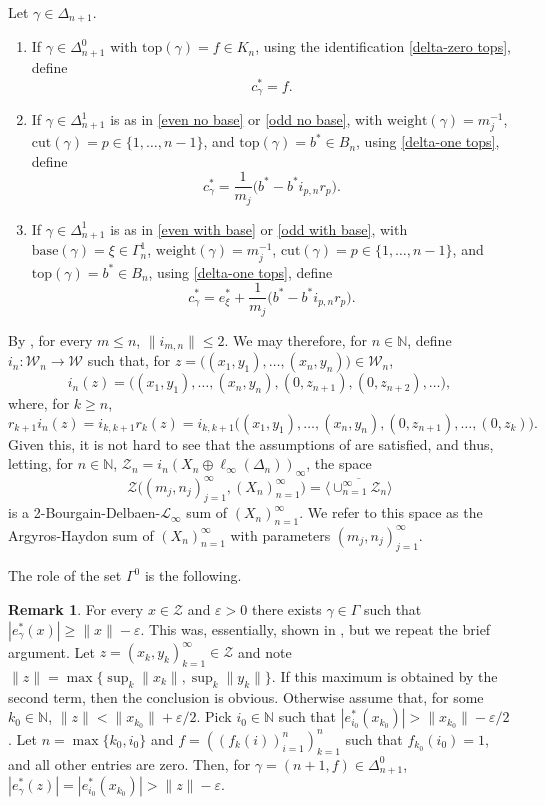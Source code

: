 \documentclass[11pt]{amsart}
\theoremstyle{definition}
\newtheorem{remark}[theorem]{Remark}
\newcommand{\N}{\mathbb{N}}
\newcommand{\e}{\varepsilon}
\numberwithin{equation}{section}
\begin{document}
 
 Let $\gamma\in\Delta_{n+1}$.
 \begin{enumerate}[label=(\roman*),leftmargin=21pt]
    
     \item If $\gamma\in\Delta_{n+1}^0$ with $\mathrm{top}(\gamma) = f\in K_n$, using the identification \eqref{delta-zero tops}, define
     \[c_\gamma^* = f.\]
     
     \item If $\gamma\in\Delta_{n+1}^1$ is as in \ref{even no base} or \ref{odd no base}, with $\mathrm{weight}(\gamma) = m_j^{-1}$, $\mathrm{cut}(\gamma) = p\in\{1,\ldots,n-1\}$, and $\mathrm{top}(\gamma) = b^*\in B_n$, using \eqref{delta-one tops}, define
     \[c_\gamma^* = \frac{1}{m_j}\big(b^*-b^*i_{p,n}r_p\big).\]

     \item If $\gamma\in\Delta_{n+1}^1$ is as in \ref{even with base} or \ref{odd with base}, with $\mathrm{base}(\gamma) = \xi\in\Gamma_n^1$, $\mathrm{weight}(\gamma) = m_j^{-1}$, $\mathrm{cut}(\gamma) = p\in\{1,\ldots,n-1\}$, and $\mathrm{top}(\gamma) = b^*\in B_n$, using \eqref{delta-one tops}, define
    \[c_\gamma^* = e_\xi^*+\frac{1}{m_j}\big(b^*-b^*i_{p,n}r_p\big).\]
    
 \end{enumerate}

By \cite[Proposition 5.1]{zisimopoulou:2014}, for every $m\leq n$, $\|i_{m,n}\|\leq 2$. We may therefore, for $n\in\N$, define $i_n:\mathcal{W}_n\to\mathcal{W}$ such that, for $z = \big((x_1,y_1),\ldots,(x_n,y_n)\big)\in\mathcal{W}_n$,
\[i_n(z) = \big((x_1,y_1),\ldots,(x_n,y_n),(0,z_{n+1}),(0,z_{n+2}),\ldots\big),\]
where, for $k\geq n$,
\[r_{k+1}i_n(z) = i_{k,k+1}r_{k}(z) = i_{k,k+1}\big((x_1,y_1),\ldots,(x_n,y_n),(0,z_{n+1}),\ldots,(0,z_{k})\big).\]
Given this, it is not hard to see that the assumptions of  are satisfied, and thus, letting, for $n\in\N$, $\mathcal{Z}_n = i_n(X_n\oplus\ell_\infty(\Delta_n))_\infty$, the space
\[\mathcal{Z}\big((m_j,n_j)_{j=1}^\infty,(X_n)_{n=1}^\infty\big) =  \overline{\langle\cup_{n=1}^\infty\mathcal{Z}_n\rangle}\]
is a 2-Bourgain-Delbaen-$\mathscr{L}_\infty$ sum of $(X_n)_{n=1}^\infty$. We refer to this space as the Argyros-Haydon sum of $(X_n)_{n=1}^\infty$ with parameters $(m_j,n_j)_{j=1}^\infty$.

The role of the set $\Gamma^0$ is the following.

\begin{remark}
For every $x\in\mathcal{Z}$ and $\e>0$ there exists $\gamma\in\Gamma$ such that $|e_\gamma^*(x)| \geq \|x\|-\e$. This was, essentially, shown in \cite[Lemma 5.7]{zisimopoulou:2014}, but we repeat the brief argument. Let $z = (x_k,y_k)_{k=1}^\infty\in\mathcal{Z}$ and note $\|z\| = \max\{\sup_k\|x_k\|,\sup_k\|y_k\|\}$. If this maximum is obtained by the second term, then the conclusion is obvious. Otherwise assume that, for some $k_0\in\N$, $\|z\| <\|x_{k_0}\| + \e/2$. Pick $i_0\in\N$ such that $|e_{i_0}^*(x_{k_0})| > \|x_{k_0}\| - \e/2$. Let $n=\max\{k_0, i_0\}$ and $f = ((f_k(i))_{i=1}^n)_{k=1}^n$ such that $f_{k_0}(i_0) = 1$, and all other entries are zero. Then, for $\gamma = (n+1,f)\in\Delta_{n+1}^0$, $|e_\gamma^*(z)| = |e_{i_0}^*(x_{k_0})| > \|z\|-\e$.
\end{remark}
\end{document}
